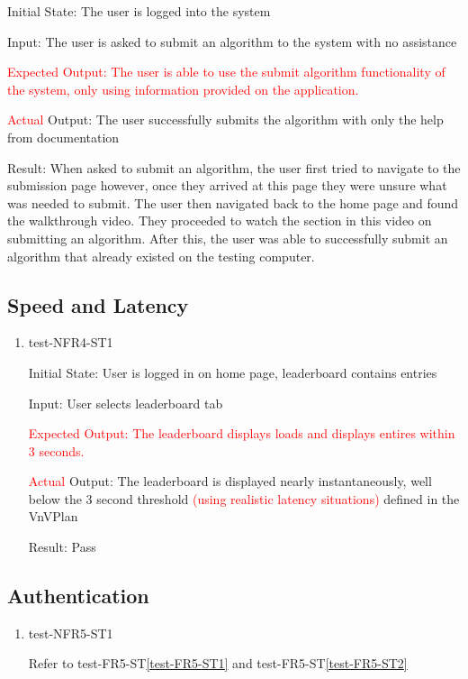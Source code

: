 \documentclass[12pt, titlepage]{article}
\begin{document}
\begin{enumerate}
Initial State: The user is logged into the system

Input: The user is asked to submit an algorithm to the system with no assistance 

\textcolor{red}{Expected Output: The user is able to use the submit algorithm functionality of the system, only using information provided on the application.}

\textcolor{red}{Actual} Output: The user successfully submits the algorithm with only the help from documentation

Result: When asked to submit an algorithm, the user first tried to navigate to the submission page however, once they arrived at this page they were unsure what was needed to submit. The user then navigated back to the home page and found the walkthrough video. They proceeded to watch the section in this video on submitting an algorithm. After this, the user was able to successfully submit an algorithm that already existed on the testing computer.
\end{enumerate}

\subsection{Speed and Latency}
\begin{enumerate}
\item{test-NFR4-ST1} \label{test-NFR4-ST1}

Initial State: User is logged in on home page, leaderboard contains entries

Input: User selects leaderboard tab

\textcolor{red}{Expected Output: The leaderboard displays loads and displays entires within 3 seconds.}

\textcolor{red}{Actual} Output: The leaderboard is displayed nearly instantaneously, well below the 3 second threshold \textcolor{red}{(using realistic latency situations)} defined in the VnVPlan

Result: Pass

\end{enumerate}
\subsection{Authentication}
\begin{enumerate}
\item{test-NFR5-ST1} \label{test-NFR5-ST1}

Refer to test-FR5-ST\ref{test-FR5-ST1} and test-FR5-ST\ref{test-FR5-ST2}
\end{enumerate}
\end{document}
